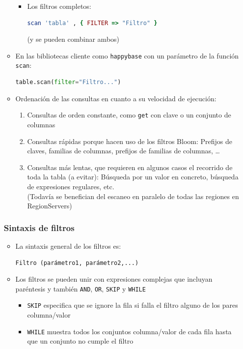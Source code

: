 \documentclass[14pt]{beamer}
\begin{document}
\begin{frame}
\begin{itemize}
\begin{frame}
\begin{itemize}
\begin{itemize}
  \item Los filtros completos:

\begin{lstlisting}[language=ruby]
scan 'tabla' , { FILTER => "Filtro" }
\end{lstlisting}

(y se pueden combinar ambos)
  \end{itemize}

\framebreak

\item En las bibliotecas cliente como {\tt happybase} con un parámetro de
  la función {\tt scan}:
\begin{lstlisting}[language=Python]
table.scan(filter="Filtro...")
\end{lstlisting}

\framebreak

\item Ordenación de las consultas en cuanto a su velocidad de ejecución:
  \begin{enumerate}
  \item Consultas de orden constante, como {\tt get} con clave o un
    conjunto de columnas
  \item Consultas rápidas porque hacen uso de los filtros Bloom: Prefijos
    de claves, familias de columnas, prefijos de familias de columnas,
    \ldots
  \item Consultas más lentas, que requieren en algunos casos el
    recorrido de toda la tabla (a evitar): Búsqueda por un valor en
    concreto, búsqueda de expresiones regulares, etc.\\
    (Todavía se benefician del escaneo en paralelo de todas las
    regiones en RegionServers)
  \end{enumerate}
\end{itemize}
\end{frame}


\begin{frame}
  \frametitle{Sintaxis de filtros}
  \begin{itemize}
  \item La sintaxis general de los filtros es:

\begin{verbatim}
Filtro (parámetro1, parámetro2,...)
\end{verbatim}

  \item Los filtros se pueden unir con expresiones complejas que incluyan
    paréntesis y también {\tt AND}, {\tt OR}, {\tt SKIP} y {\tt WHILE}
    \begin{itemize}
    \item {\tt SKIP} especifica que se ignore la fila si falla el filtro
      alguno de los pares columna/valor
    \item {\tt WHILE} muestra todos los conjuntos columna/valor de cada
      fila hasta que un conjunto no cumple el filtro
    \end{itemize}


\end{itemize}
\end{frame}
\end{itemize}
\end{frame}
\end{document}
